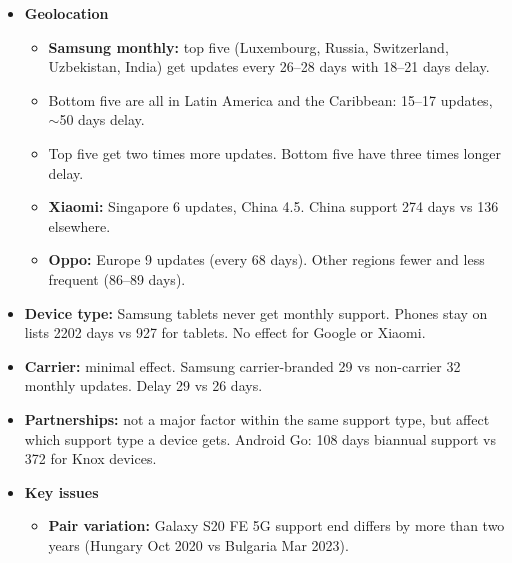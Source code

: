 \documentclass[11pt,a4paper]{article}
\begin{document}
\begin{enumerate}
\begin{itemize}
\begin{itemize}
            \item Time on lists: 1044 / 573 / 580 days (monthly / quarterly / biannual), 2197 days ($\sim$6 years) total.
            \item Actual median support: 1034 / 560 / 442 days. Biannual support is much shorter than listed.
            \item Updates: 33 / 9 / 4. Median frequency: 30 / 53 / 91 days (better than the names imply).
            \item Delay: 25 / 42 / 62 days. Up to 300 days for some models still on the list.
            \item \textbf{Oppo:} monthly-listed devices got no updates while on the list.
        \end{itemize}
        \item \textbf{Geolocation}
        \begin{itemize}
            \item \textbf{Samsung monthly:} top five (Luxembourg, Russia, Switzerland, Uzbekistan, India) get updates every 26--28 days with 18--21 days delay.
            \item Bottom five are all in Latin America and the Caribbean: 15--17 updates, $\sim$50 days delay.
            \item Top five get two times more updates. Bottom five have three times longer delay.
            \item \textbf{Xiaomi:} Singapore 6 updates, China 4.5. China support 274 days vs 136 elsewhere.
            \item \textbf{Oppo:} Europe 9 updates (every 68 days). Other regions fewer and less frequent (86--89 days).
        \end{itemize}
        \item \textbf{Device type:} Samsung tablets never get monthly support. Phones stay on lists 2202 days vs 927 for tablets. No effect for Google or Xiaomi.
        \item \textbf{Carrier:} minimal effect. Samsung carrier-branded 29 vs non-carrier 32 monthly updates. Delay 29 vs 26 days.
        \item \textbf{Partnerships:} not a major factor within the same support type, but affect which support type a device gets. Android Go: 108 days biannual support vs 372 for Knox devices.
        \item \textbf{Key issues}
        \begin{itemize}
            \item \textbf{Pair variation:} Galaxy S20 FE 5G support end differs by more than two years (Hungary Oct 2020 vs Bulgaria Mar 2023).

\end{itemize}
\end{itemize}
\end{enumerate}
\end{document}

